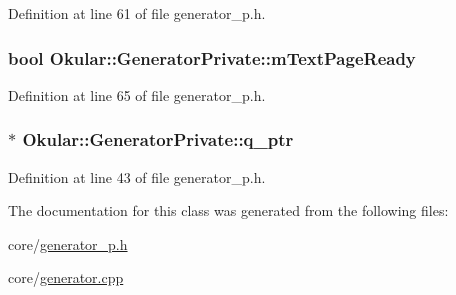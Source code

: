 Definition at line 61 of file generator\+\_\+p.\+h.

\hypertarget{classOkular_1_1GeneratorPrivate_a755c2ed0be6fae5b3c2f9500aa6f1143}{
\subsubsection[{m\+Text\+Page\+Ready}]{\setlength{\rightskip}{0pt plus 5cm}bool Okular\+::\+Generator\+Private\+::m\+Text\+Page\+Ready}}\label{classOkular_1_1GeneratorPrivate_a755c2ed0be6fae5b3c2f9500aa6f1143}


Definition at line 65 of file generator\+\_\+p.\+h.

\hypertarget{classOkular_1_1GeneratorPrivate_a7cfb588657967371d94b37d79c4be1d2}{
\subsubsection[{q\+\_\+ptr}]{$\ast$ Okular\+::\+Generator\+Private\+::q\+\_\+ptr}}\label{classOkular_1_1GeneratorPrivate_a7cfb588657967371d94b37d79c4be1d2}


Definition at line 43 of file generator\+\_\+p.\+h.



The documentation for this class was generated from the following files\+:\begin{DoxyCompactItemize}
\item 
core/\hyperlink{generator__p_8h}{generator\+\_\+p.\+h}\item 
core/\hyperlink{generator_8cpp}{generator.\+cpp}\end{DoxyCompactItemize}
